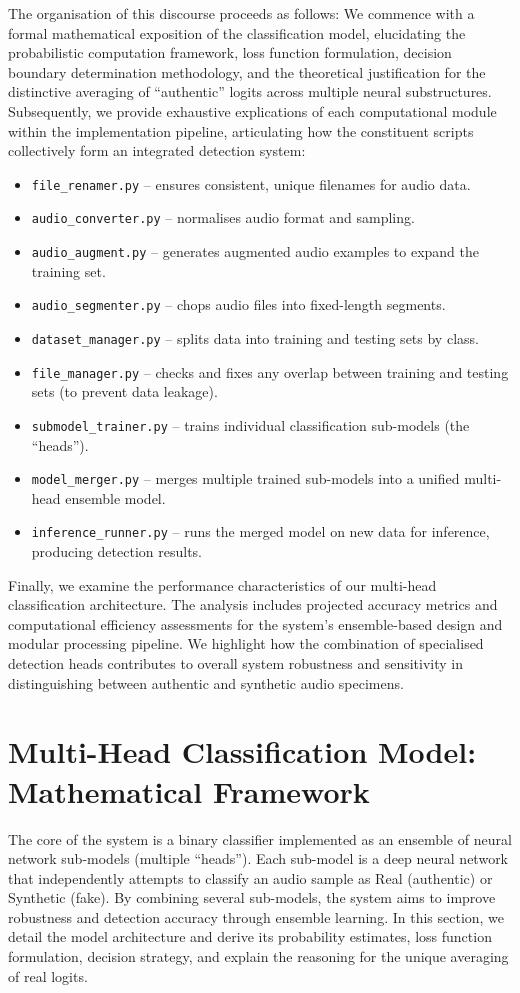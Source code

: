 \documentclass[conference]{IEEEtran}  %
\begin{document}
The organisation of this discourse proceeds as follows: We commence with a formal mathematical exposition of the classification model, elucidating the probabilistic computation framework, loss function formulation, decision boundary determination methodology, and the theoretical justification for the distinctive averaging of ``authentic'' logits across multiple neural substructures. Subsequently, we provide exhaustive explications of each computational module within the implementation pipeline, articulating how the constituent scripts collectively form an integrated detection system:
\begin{itemize}
    \item \texttt{file\_renamer.py} -- ensures consistent, unique filenames for audio data.
    \item \texttt{audio\_converter.py} -- normalises audio format and sampling.
    \item \texttt{audio\_augment.py} -- generates augmented audio examples to expand the training set.
    \item \texttt{audio\_segmenter.py} -- chops audio files into fixed-length segments.
    \item \texttt{dataset\_manager.py} -- splits data into training and testing sets by class.
    \item \texttt{file\_manager.py} -- checks and fixes any overlap between training and testing sets (to prevent data leakage).
    \item \texttt{submodel\_trainer.py} -- trains individual classification sub-models (the ``heads'').
    \item \texttt{model\_merger.py} -- merges multiple trained sub-models into a unified multi-head ensemble model.
    \item \texttt{inference\_runner.py} -- runs the merged model on new data for inference, producing detection results.
\end{itemize}

Finally, we examine the performance characteristics of our multi-head classification architecture. The analysis includes projected accuracy metrics and computational efficiency assessments for the system's ensemble-based design and modular processing pipeline. We highlight how the combination of specialised detection heads contributes to overall system robustness and sensitivity in distinguishing between authentic and synthetic audio specimens.

\section{Multi-Head Classification Model: Mathematical Framework}
The core of the system is a binary classifier implemented as an ensemble of neural network sub-models (multiple ``heads''). Each sub-model is a deep neural network that independently attempts to classify an audio sample as Real (authentic) or Synthetic (fake). By combining several sub-models, the system aims to improve robustness and detection accuracy through ensemble learning. In this section, we detail the model architecture and derive its probability estimates, loss function formulation, decision strategy, and explain the reasoning for the unique averaging of real logits.
\end{document}
